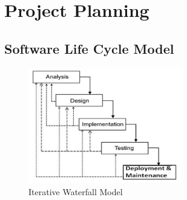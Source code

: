 
\section{Project Planning}

\subsection{Software Life Cycle Model}

\begin{figure}[h!]  
    \centering
    \includegraphics[width=0.6\textwidth]{Images/01 Life_cycle.jpg}  
    \caption{Iterative Waterfall Model}
    \label{Iterative Waterfall Model}  %
\end{figure}

